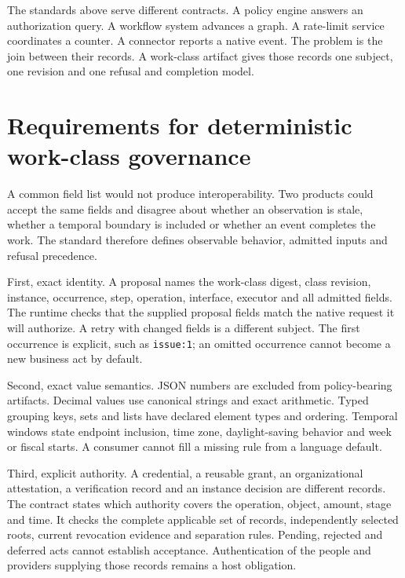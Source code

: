 \documentclass[
  american,
  11pt,
  letterpaper,
]{article}
\newcommand{\passthrough}[1]{#1}
\begin{document}
The standards above serve different contracts. A policy engine answers
an authorization query. A workflow system advances a graph. A rate-limit
service coordinates a counter. A connector reports a native event. The
problem is the join between their records. A work-class artifact gives
those records one subject, one revision and one refusal and completion
model.

\section{Requirements for deterministic work-class
governance}\label{requirements-for-deterministic-work-class-governance}

A common field list would not produce interoperability. Two products
could accept the same fields and disagree about whether an observation
is stale, whether a temporal boundary is included or whether an event
completes the work. The standard therefore defines observable behavior,
admitted inputs and refusal precedence.

First, exact identity. A proposal names the work-class digest, class
revision, instance, occurrence, step, operation, interface, executor and
all admitted fields. The runtime checks that the supplied proposal
fields match the native request it will authorize. A retry with changed
fields is a different subject. The first occurrence is explicit, such as
\passthrough{\lstinline!issue:1!}; an omitted occurrence cannot become a
new business act by default.

Second, exact value semantics. JSON numbers are excluded from
policy-bearing artifacts. Decimal values use canonical strings and exact
arithmetic. Typed grouping keys, sets and lists have declared element
types and ordering. Temporal windows state endpoint inclusion, time
zone, daylight-saving behavior and week or fiscal starts. A consumer
cannot fill a missing rule from a language default.

Third, explicit authority. A credential, a reusable grant, an
organizational attestation, a verification record and an instance
decision are different records. The contract states which authority
covers the operation, object, amount, stage and time. It checks the
complete applicable set of records, independently selected roots,
current revocation evidence and separation rules. Pending, rejected and
deferred acts cannot establish acceptance. Authentication of the people
and providers supplying those records remains a host obligation.
\end{document}
